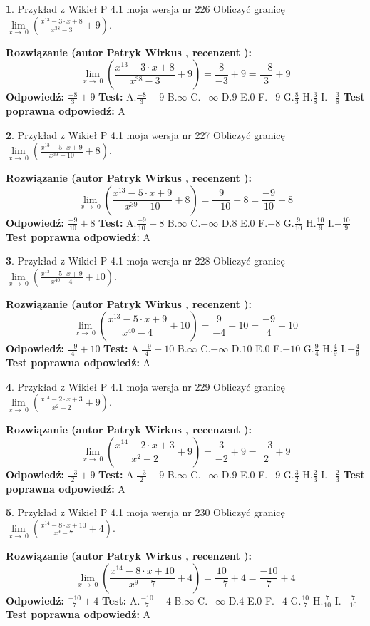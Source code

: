 \documentclass[12pt, a4paper]{article}
\theoremstyle{definition} %
\newtheorem{zad}{}
\newcommand{\zadStart}[1]{\begin{zad}#1\newline}
\newcommand{\zadStop}{\end{zad}}
\newcommand{\rozwStart}[2]{\noindent \textbf{Rozwiązanie (autor #1 , recenzent #2): }\newline}
\newcommand{\rozwStop}{\newline}
\newcommand{\odpStart}{\noindent \textbf{Odpowiedź:}\newline}
\newcommand{\odpStop}{\newline}
\newcommand{\testStart}{\noindent \textbf{Test:}\newline}
\newcommand{\testStop}{\newline}
\newcommand{\kluczStart}{\noindent \textbf{Test poprawna odpowiedź:}\newline}
\newcommand{\kluczStop}{\newline}
\begin{document}
\zadStart{Przykład z Wikieł P 4.1 moja wersja nr 226}
Obliczyć granicę $\lim\limits_{x\to\ 0}(\frac{x^{13}-3 \cdot x +8}{x^{38}-3}+9)$.
\zadStop
\rozwStart{Patryk Wirkus}{}
$$\lim\limits_{x\to\ 0}(\frac{x^{13}-3 \cdot x +8}{x^{38}-3}+9)=\frac{8}{-3}+9=\frac{-8}{3}+9$$
\rozwStop
\odpStart
$\frac{-8}{3}+9$
\odpStop
\testStart
A.$\frac{-8}{3}+9$
B.$\infty$
C.$-\infty$
D.$9$
E.$0$
F.$-9$
G.$\frac{8}{3}$
H.$\frac{3}{8}$
I.$-\frac{3}{8}$
\testStop
\kluczStart
A
\kluczStop



\zadStart{Przykład z Wikieł P 4.1 moja wersja nr 227}
Obliczyć granicę $\lim\limits_{x\to\ 0}(\frac{x^{13}-5 \cdot x +9}{x^{39}-10}+8)$.
\zadStop
\rozwStart{Patryk Wirkus}{}
$$\lim\limits_{x\to\ 0}(\frac{x^{13}-5 \cdot x +9}{x^{39}-10}+8)=\frac{9}{-10}+8=\frac{-9}{10}+8$$
\rozwStop
\odpStart
$\frac{-9}{10}+8$
\odpStop
\testStart
A.$\frac{-9}{10}+8$
B.$\infty$
C.$-\infty$
D.$8$
E.$0$
F.$-8$
G.$\frac{9}{10}$
H.$\frac{10}{9}$
I.$-\frac{10}{9}$
\testStop
\kluczStart
A
\kluczStop



\zadStart{Przykład z Wikieł P 4.1 moja wersja nr 228}
Obliczyć granicę $\lim\limits_{x\to\ 0}(\frac{x^{13}-5 \cdot x +9}{x^{40}-4}+10)$.
\zadStop
\rozwStart{Patryk Wirkus}{}
$$\lim\limits_{x\to\ 0}(\frac{x^{13}-5 \cdot x +9}{x^{40}-4}+10)=\frac{9}{-4}+10=\frac{-9}{4}+10$$
\rozwStop
\odpStart
$\frac{-9}{4}+10$
\odpStop
\testStart
A.$\frac{-9}{4}+10$
B.$\infty$
C.$-\infty$
D.$10$
E.$0$
F.$-10$
G.$\frac{9}{4}$
H.$\frac{4}{9}$
I.$-\frac{4}{9}$
\testStop
\kluczStart
A
\kluczStop



\zadStart{Przykład z Wikieł P 4.1 moja wersja nr 229}
Obliczyć granicę $\lim\limits_{x\to\ 0}(\frac{x^{14}-2 \cdot x +3}{x^{2}-2}+9)$.
\zadStop
\rozwStart{Patryk Wirkus}{}
$$\lim\limits_{x\to\ 0}(\frac{x^{14}-2 \cdot x +3}{x^{2}-2}+9)=\frac{3}{-2}+9=\frac{-3}{2}+9$$
\rozwStop
\odpStart
$\frac{-3}{2}+9$
\odpStop
\testStart
A.$\frac{-3}{2}+9$
B.$\infty$
C.$-\infty$
D.$9$
E.$0$
F.$-9$
G.$\frac{3}{2}$
H.$\frac{2}{3}$
I.$-\frac{2}{3}$
\testStop
\kluczStart
A
\kluczStop



\zadStart{Przykład z Wikieł P 4.1 moja wersja nr 230}
Obliczyć granicę $\lim\limits_{x\to\ 0}(\frac{x^{14}-8 \cdot x +10}{x^{9}-7}+4)$.
\zadStop
\rozwStart{Patryk Wirkus}{}
$$\lim\limits_{x\to\ 0}(\frac{x^{14}-8 \cdot x +10}{x^{9}-7}+4)=\frac{10}{-7}+4=\frac{-10}{7}+4$$
\rozwStop
\odpStart
$\frac{-10}{7}+4$
\odpStop
\testStart
A.$\frac{-10}{7}+4$
B.$\infty$
C.$-\infty$
D.$4$
E.$0$
F.$-4$
G.$\frac{10}{7}$
H.$\frac{7}{10}$
I.$-\frac{7}{10}$
\testStop
\kluczStart
A
\kluczStop
\end{document}
